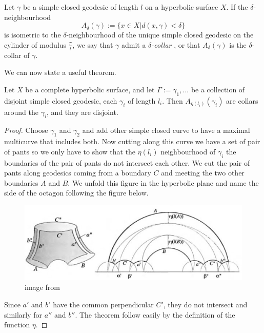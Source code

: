 \begin{dfnt}
Let $\gamma$ be a simple closed geodesic of length $l$ on a hyperbolic surface $X$. If the $\delta$-neighbourhood \[
A_\delta(\gamma):= \{ x \in X | d(x,\gamma) < \delta \}
\]
is isometric to the $\delta$-neighbourhood of the unique simple closed geodesic on the cylinder of modulus $\frac{\pi}{l}$, we say that $\gamma$ admit a \emph{$\delta$-collar}
, or that $A_\delta(\gamma)$ is the $\delta$-collar of $\gamma$.
\end{dfnt}

We can now state a useful theorem.

\begin{thm}\label{ColLem}
Let $X$ be a complete hyperbolic surface, and let $\Gamma:={\gamma_1,...}$ be a collection of disjoint simple closed geodesic, each $\gamma_i$ of length $l_i$. Then $A_{\eta(l_i)}(\gamma_i)$ are collars around the $\gamma_i$, and they are disjoint.
\end{thm}

\begin{proof}
Choose $\gamma_1$ and $\gamma_2$ and add other simple closed curve to have a maximal multicurve that includes both.
Now cutting along this curve we have a set of pair of pants so we only have to show that the $\eta(l_i)$ neighbourhood of $\gamma_i$ the boundaries of the pair of pants do not intersect each other. We cut the pair of pants along geodesics coming from a boundary $C$ and meeting the two other boundaries $A$ and $B$. We unfold this figure in the hyperbolic plane and name the side of the octagon following the figure below.

\begin{figure}[h!]
\centering
\includegraphics[width=12cm]{Image/CollarProof.jpg}
\caption{image from \cite{hubbardhal01297628}}
\end{figure}

Since $a'$ and $b'$ have the common perpendicular $C'$, they do not intersect and similarly for $a''$ and $b''$. The theorem follow easily by the definition of the function $\eta$.

\end{proof}

